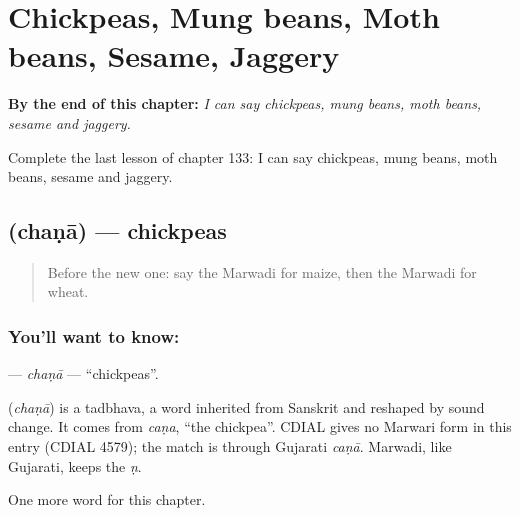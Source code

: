 
\chapter{Chickpeas, Mung beans, Moth beans, Sesame, Jaggery}
\label{ch:mw-chickpeas-mung-beans-moth-beans-sesame-jaggery}

\begin{chapteropening}
\textbf{By the end of this chapter:} \emph{I can say chickpeas, mung beans, moth beans, sesame and jaggery.}

Complete the last lesson of chapter 133: I can say chickpeas, mung beans, moth beans, sesame and jaggery.
\end{chapteropening}

\section[\texorpdfstring{\mw{चणा} (chaṇā)}{चणा (chaṇā)}]{ (chaṇā) — chickpeas}

\label{lesson:MW-C133-chana}



\begin{quote}
Before the new one: say the Marwadi for maize, then the Marwadi for wheat.
\end{quote}

\subsection*{You'll want to know: }
\textbf{} — \emph{chaṇā} — \textquotedblleft{}chickpeas\textquotedblright{}.

\begin{cousinweb}
\textbf{} (\emph{chaṇā}) is a tadbhava, a word inherited from Sanskrit and reshaped by sound change. It comes from \emph{caṇa}, \textquotedblleft{}the chickpea\textquotedblright{}. CDIAL gives no Marwari form in this entry (CDIAL 4579); the match is through Gujarati \emph{caṇā}. Marwadi, like Gujarati, keeps the \emph{ṇ}.
\end{cousinweb}

\begin{grammarlens}[title={What you've built}]
One more word for this chapter.
\end{grammarlens}

